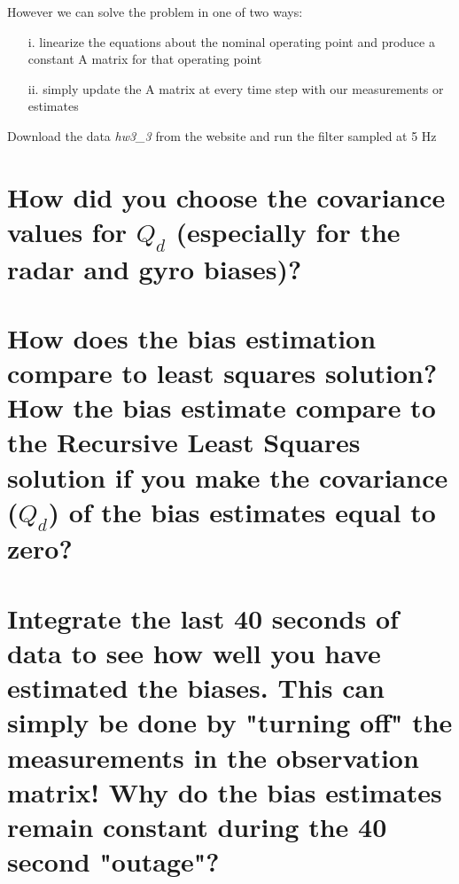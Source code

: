 \documentclass[12pt,letterpaper, onecolumn]{exam}
\begin{document}
\begin{questions}
{        However we can solve the problem in one of two ways:
        \begin{itemize}
            \item[i.] linearize the equations about the nominal operating point and produce a constant A matrix for that operating point
            \item[ii.] simply update the A matrix at every time step with our measurements or estimates
        \end{itemize}
        Download the data \textit{hw3\_3} from the website and run the filter sampled at 5 Hz}
    \begin{parts}
        \part{How did you choose the covariance values for $Q_d$ (especially for the radar and gyro biases)?}

        \part{How does the bias estimation compare to least squares solution? How the bias estimate compare to the Recursive Least Squares solution if you make the covariance ($Q_d$) of the bias estimates equal to zero?}

        \part{Integrate the last 40 seconds of data to see how well you have estimated the biases. This can simply be done by "turning off" the measurements in the observation matrix! Why do the bias estimates remain constant during the 40 second "outage"?}


\end{parts}
\end{questions}
\end{document}
